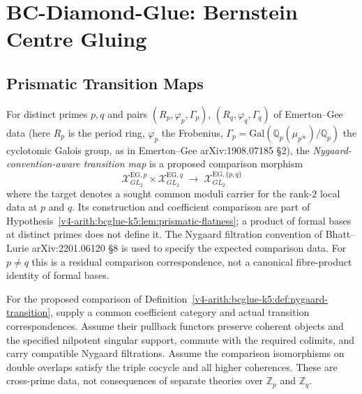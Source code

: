 \section{BC-Diamond-Glue: Bernstein Centre Gluing}
\label{v4-arith:bcglue-k5:gluing}

\subsection{Prismatic Transition Maps}

\begin{definition}
\label{v4-arith:bcglue-k5:def:nygaard-transition}
For distinct primes \(p,q\) and pairs
\((R_{p},\varphi_{p},\Gamma_{p})\), \((R_{q},\varphi_{q},\Gamma_{q})\)
of Emerton--Gee data (here \(R_{p}\) is the period ring,
\(\varphi_{p}\) the Frobenius, \(\Gamma_{p}=\mathrm{Gal}(\mathbb{Q}_{p}(\mu_{p^{\infty}})/\mathbb{Q}_{p})\)
the cyclotomic Galois group, as in Emerton--Gee arXiv:1908.07185 \S2),
the \emph{Nygaard-convention-aware transition
map} is a proposed comparison morphism
\[
\mathcal{X}^{\mathrm{EG},p}_{GL_{2}}\times\mathcal{X}^{\mathrm{EG},q}_{GL_{2}}\;\to\;\mathcal{X}^{\mathrm{EG},\{p,q\}}_{GL_{2}}
\]
where the target denotes a sought common moduli carrier for the
rank-\(2\) local data at \(p\) and \(q\). Its construction and
coefficient comparison are part of
Hypothesis~\ref{v4-arith:bcglue-k5:lem:prismatic-flatness}; a product
of formal bases at distinct primes does not define it.
The Nygaard filtration convention of Bhatt--Lurie
arXiv:2201.06120 \S8 is used to specify the expected comparison data.
For \(p\neq q\) this is a residual comparison correspondence, not a
canonical fibre-product identity of formal bases.
\end{definition}

\begin{hypothesis}
\label{v4-arith:bcglue-k5:lem:prismatic-flatness}
For the proposed comparison of
Definition~\ref{v4-arith:bcglue-k5:def:nygaard-transition}, supply a
common coefficient category and actual transition correspondences.
Assume their pullback functors preserve coherent objects and the
specified nilpotent singular support, commute with the required
colimits, and carry compatible Nygaard filtrations. Assume the
comparison isomorphisms on double overlaps satisfy the triple
cocycle and all higher coherences. These are cross-prime data,
not consequences of separate theories over \(\mathbb Z_p\) and
\(\mathbb Z_q\).
\end{hypothesis}

